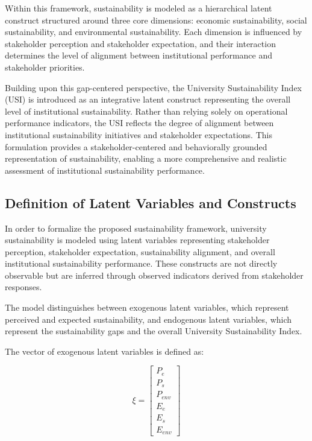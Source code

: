 \documentclass[11pt,a4paper]{article}
\begin{document}
Within this framework, sustainability is modeled as a hierarchical latent construct structured around three core dimensions: economic sustainability, social sustainability, and environmental sustainability. Each dimension is influenced by stakeholder perception and stakeholder expectation, and their interaction determines the level of alignment between institutional performance and stakeholder priorities.

Building upon this gap-centered perspective, the University Sustainability Index (USI) is introduced as an integrative latent construct representing the overall level of institutional sustainability. Rather than relying solely on operational performance indicators, the USI reflects the degree of alignment between institutional sustainability initiatives and stakeholder expectations. This formulation provides a stakeholder-centered and behaviorally grounded representation of sustainability, enabling a more comprehensive and realistic assessment of institutional sustainability performance.


\subsection{Definition of Latent Variables and Constructs}

In order to formalize the proposed sustainability framework, university sustainability is modeled using latent variables representing stakeholder perception, stakeholder expectation, sustainability alignment, and overall institutional sustainability performance. These constructs are not directly observable but are inferred through observed indicators derived from stakeholder responses.

The model distinguishes between exogenous latent variables, which represent perceived and expected sustainability, and endogenous latent variables, which represent the sustainability gaps and the overall University Sustainability Index.

The vector of exogenous latent variables is defined as:

\begin{equation}
\xi =
\begin{bmatrix}
P_e \\
P_s \\
P_{env} \\
E_e \\
E_s \\
E_{env}
\end{bmatrix}
\end{equation}
\end{document}
